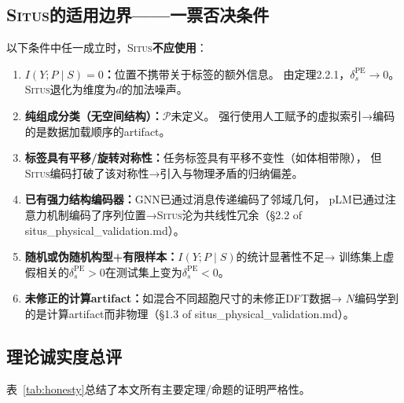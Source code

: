 \documentclass[11pt,a4paper]{article}
\theoremstyle{remark}
\DeclareMathOperator{\PE}{PE}
\newcommand{\Ppos}{\mathcal{P}}
\newcommand{\Situs}{\textsc{Situs}}
\begin{document}
\subsection{\Situs{}的适用边界——一票否决条件}

以下条件中任一成立时，\Situs{}\textbf{不应使用}：

\begin{enumerate}[label=(F\arabic*), leftmargin=*]
    \item \textbf{$I(Y; P \mid S) = 0$：}位置不携带关于标签的额外信息。
          由定理2.2.1，$\delta_s^{\PE} \to 0$。\Situs{}退化为维度为$d$的加法噪声。
    \item \textbf{纯组成分类（无空间结构）：}$\Ppos$未定义。
          强行使用人工赋予的虚拟索引→编码的是数据加载顺序的artifact。
    \item \textbf{标签具有平移/旋转对称性：}任务标签具有平移不变性（如体相带隙），
          但\Situs{}编码打破了该对称性→引入与物理矛盾的归纳偏差。
    \item \textbf{已有强力结构编码器：}GNN已通过消息传递编码了邻域几何，
          pLM已通过注意力机制编码了序列位置→\Situs{}沦为共线性冗余（\S2.2 of
          situs\_physical\_validation.md）。
    \item \textbf{随机或伪随机构型+有限样本：}$I(Y; P \mid S)$的统计显著性不足→
          训练集上虚假相关的$\delta_s^{\PE} > 0$在测试集上变为$\delta_s^{\PE} < 0$。
    \item \textbf{未修正的计算artifact：}如混合不同超胞尺寸的未修正DFT数据→
          $N$编码学到的是计算artifact而非物理（\S1.3 of
          situs\_physical\_validation.md）。
\end{enumerate}

\subsection{理论诚实度总评}

表~\ref{tab:honesty}总结了本文所有主要定理/命题的证明严格性。
\end{document}
